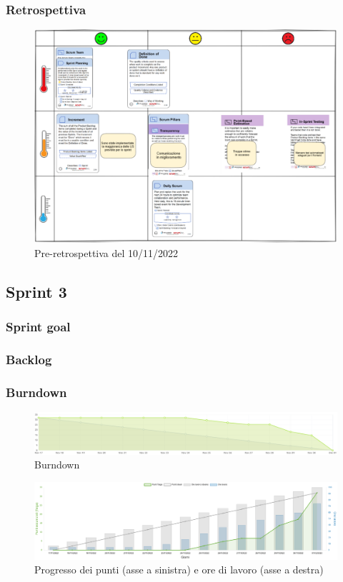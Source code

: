 \documentclass[11pt]{article}
\begin{document}
\subsubsection{Retrospettiva}
\begin{figure}[H]
    \centering
    \includegraphics[width=15cm]{./img/sprint2/preretrospettiva.png}
    \caption{Pre-retrospettiva del 10/11/2022}
\end{figure}


\subsection{Sprint 3}
\subsubsection{Sprint goal}

\subsubsection{Backlog}

\subsubsection{Burndown}
\begin{figure}[H]
    \centering
    \includegraphics[width=15cm]{./img/sprint3/burndown.png}
    \caption{Burndown}
\end{figure}
\begin{figure}[H]
    \centering
    \includegraphics[width=15cm]{./img/sprint3/worktime.png}
    \caption{Progresso dei punti (asse a sinistra) e ore di lavoro (asse a destra)}
\end{figure}
\end{document}
